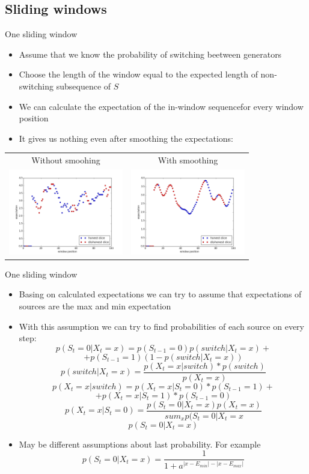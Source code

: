 \documentclass[hyperref=unicode,graphics=pdflatex,13pt]{beamer}
\begin{document}
\subsection{Sliding windows}
\begin{frame}{One sliding window}
\begin{itemize}
   \item Assume that we know the probability of switching beetween generators
   \item Choose the length of the window equal to the expected length of non-switching subsequence of $S$
   \item We can calculate the expectation of the in-window sequencefor every window position
   \item It gives us nothing even after smoothing the expectations:
   \end{itemize}
   \begin{tabular}{cc}
      Without smoohing & With smoothing \\
      \includegraphics[width=5cm]{window_expectations.png} &
      \includegraphics[width=5cm]{window_expectations_smoothed.png}
   \end{tabular}


\end{frame}

\begin{frame}{One sliding window}
\begin{itemize}
   \item Basing on calculated expectations we can try to assume that expectations of sources are the max and min expectation
   \item With this assumption we can try to find probabilities of each source on every step:
   \footnotesize$$p(S_t = 0 | X_t = x) = p(S_{t - 1} = 0) p(switch | X_t = x) +$$
   $$+p(S_{t - 1} = 1) (1 - p(switch | X_t = x))$$
   $$p(switch | X_t = x) = \frac{p(X_t = x| switch) * p(switch)}{p(X_t = x)}$$
   \footnotesize$$p(X_t = x| switch) = p(X_t = x | S_t = 0) * p(S_{t - 1} = 1) + $$
   $$+p(X_t = x | S_t = 1) * p(S_{t - 1} = 0)$$
   $$p(X_t = x | S_t = 0) = \frac{p(S_t = 0 | X_t = x)p(X_t = x)}{sum_{x} p(S_t = 0 | X_t = x}$$
   $$p(S_t = 0 | X_t = x)$$
   \item May be different assumptions about last probability. For example $$p(S_t = 0 | X_t = x) = \frac{1}{1 + a^{|x - E_{min}| - |x - E_{max}|}}$$
\end{itemize}
\end{frame}
\end{document}
